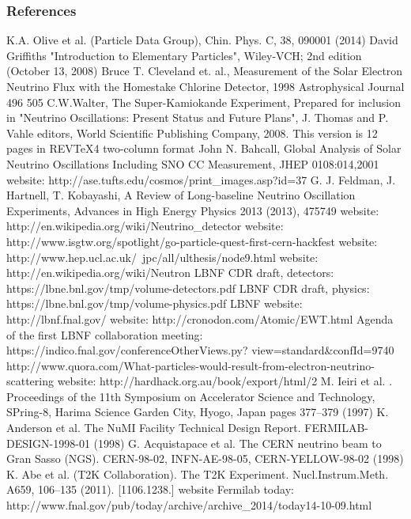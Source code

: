 \begin{frame}[allowframebreaks]\frametitle{References}
\tiny
\begin{thebibliography}{1}
    K.A. Olive et al. (Particle Data Group), Chin. Phys. C, 38, 090001 (2014) 
    David Griffiths "Introduction to Elementary Particles", Wiley-VCH; 2nd edition (October 13, 2008)
    Bruce T. Cleveland et. al., Measurement of the Solar Electron Neutrino Flux with the Homestake Chlorine Detector, 1998 Astrophysical Journal 496 505
    C.W.Walter, The Super-Kamiokande Experiment, Prepared for inclusion in "Neutrino Oscillations: Present Status and Future Plans", J. Thomas and P. Vahle editors, World Scientific Publishing Company, 2008. This version is 12 pages in REVTeX4 two-column format
    John N. Bahcall, Global Analysis of Solar Neutrino Oscillations Including SNO CC Measurement, JHEP 0108:014,2001
    website: http://ase.tufts.edu/cosmos/print\_images.asp?id=37
    G. J. Feldman, J. Hartnell, T. Kobayashi, A Review of Long-baseline Neutrino Oscillation Experiments, Advances in High Energy Physics 2013 (2013), 475749
    website: http://en.wikipedia.org/wiki/Neutrino\_detector
    website: http://www.isgtw.org/spotlight/go-particle-quest-first-cern-hackfest
    website: http://www.hep.ucl.ac.uk/~jpc/all/ulthesis/node9.html
    website: http://en.wikipedia.org/wiki/Neutron
    LBNF CDR draft, detectors: https://lbne.bnl.gov/tmp/volume-detectors.pdf
    LBNF CDR draft, physics: https://lbne.bnl.gov/tmp/volume-physics.pdf
    LBNF website: http://lbnf.fnal.gov/
    website: http://cronodon.com/Atomic/EWT.html
    Agenda of the first LBNF collaboration meeting: https://indico.fnal.gov/conferenceOtherViews.py? view=standard\&confId=9740
   http://www.quora.com/What-particles-would-result-from-electron-neutrino-scattering
    website: http://hardhack.org.au/book/export/html/2
    M. Ieiri et al. . Proceedings of the 11th Symposium on Accelerator Science and Technology, SPring-8, Harima Science Garden City, Hyogo, Japan pages 377–379 (1997)
    K. Anderson et al. The NuMI Facility Technical Design Report. FERMILAB-DESIGN-1998-01 (1998)
    G. Acquistapace et al. The CERN neutrino beam to Gran Sasso (NGS). CERN-98-02, INFN-AE-98-05, CERN-YELLOW-98-02 (1998)
    K. Abe et al. (T2K Collaboration). The T2K Experiment. Nucl.Instrum.Meth. A659, 106–135 (2011). [1106.1238.]
    website Fermilab today: http://www.fnal.gov/pub/today/archive/archive\_2014/today14-10-09.html
\end{thebibliography}
\end{frame}
